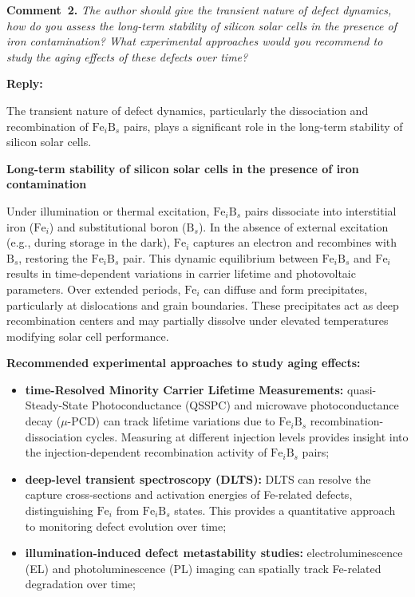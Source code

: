 \documentclass[a4paper,fleqn]{cas-sc}
\begin{document}
\vspace{1cm}
\noindent
\textcolor[rgb]{0.00,0.50,1.00}{\textbf{Comment~2.}}
\emph{ The author should give the transient nature of defect dynamics, how do you assess the long-term stability of silicon solar cells in the presence of iron contamination? What experimental approaches would you recommend to study the aging effects of these defects over time?}

\noindent
\textcolor[rgb]{0.51,0.00,0.00}{\textbf{Reply:}}

The transient nature of defect dynamics, particularly the dissociation and recombination of $\mathrm{Fe}_i\mathrm{B}_s$ pairs, plays a significant role in the long-term stability of silicon solar cells.


\textbf{Long-term stability of silicon solar cells in the presence of iron contamination}


Under illumination or thermal excitation, $\mathrm{Fe}_i\mathrm{B}_s$ pairs dissociate into interstitial iron ($\mathrm{Fe}_i$) and substitutional boron ($\mathrm{B}_s$). In the absence of external excitation (e.g., during storage in the dark), $\mathrm{Fe}_i$ captures an electron and recombines with $\mathrm{B}_s$, restoring the $\mathrm{Fe}_i\mathrm{B}_s$ pair. This dynamic equilibrium between $\mathrm{Fe}_i\mathrm{B}_s$ and $\mathrm{Fe}_i$ results in time-dependent variations in carrier lifetime and photovoltaic parameters. Over extended periods, $\mathrm{Fe}_i$ can diffuse and form precipitates, particularly at dislocations and grain boundaries. These precipitates act as deep recombination centers and may partially dissolve under elevated temperatures modifying solar cell performance.


\textbf{Recommended experimental approaches to study aging effects:}


\begin{itemize}
    \item \textbf{time-Resolved Minority Carrier Lifetime Measurements:} quasi-Steady-State Photoconductance (QSSPC) and microwave photoconductance decay ($\mu$-PCD) can track lifetime variations due to $\mathrm{Fe}_i\mathrm{B}_s$ recombination-dissociation cycles. Measuring at different injection levels provides insight into the injection-dependent recombination activity of $\mathrm{Fe}_i\mathrm{B}_s$ pairs;
    \item \textbf{deep-level transient spectroscopy (DLTS):} DLTS can resolve the capture cross-sections and activation energies of Fe-related defects, distinguishing $\mathrm{Fe}_i$ from $\mathrm{Fe}_i\mathrm{B}_s$ states. This provides a quantitative approach to monitoring defect evolution over time;
    \item \textbf{illumination-induced defect metastability studies:} electroluminescence (EL) and photoluminescence (PL) imaging can spatially track Fe-related degradation over time;
\end{itemize}
\end{document}
